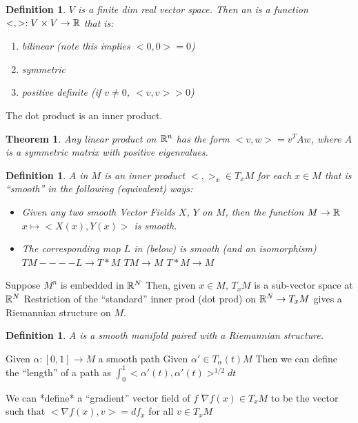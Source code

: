 \documentclass[11pt]{amsbook}
\theoremstyle{mystyle} \newtheorem{thrm}[thm]{Theorem}
\theoremstyle{mystyle} \newtheorem{defi}[thm]{Definition}
\theoremstyle{mystyle} \newtheorem{coro}[thm]{Corollary}
\theoremstyle{mystyle} \newtheorem{propo}[thm]{Proposition}
\theoremstyle{mystyle} \newtheorem{lemm}[thm]{Lemma}
\numberwithin{thm}{section}
\newcommand{\x}{\times}
\newcommand{\grad}{\nabla}
\begin{document}
\begin{defi}
	$V$ is a finite dim real vector space.  Then an  is a function $<,> : V \x V \to \R$ that is:
	\begin{enumerate}
		\item bilinear (note this implies $<0,0> = 0$)
		\item symmetric
		\item positive definite (if $v \neq 0$, $<v,v> > 0$)
	\end{enumerate}
\end{defi}
\begin{example}
	The dot product is an inner product.
\end{example}
\begin{thrm}
	Any linear product on ${\mathbb R}^n$ has the form $<v,w> = v^T A w$, where $A$ is a symmetric matrix with positive eigenvalues.
\end{thrm}
\begin{defi}
	A  in $M$ is an inner product $<,>_x \in T_xM$ for each $x \in M$ that is ``smooth'' in the following (equivalent) ways:
	\begin{itemize}
		\item
		Given any two smooth Vector Fields $X$, $Y$ on $M$, then
		the function $M \to {\mathbb R}$
		$x \mapsto <X(x), Y(x)>$
		is smooth.
		\item
		The corresponding map $L$ in (below) is smooth (and an isomorphism)
		$TM ----L\to T*M$
		$TM \to M$
		$T*M \to M$
	\end{itemize}
\end{defi}
\begin{example}
	Suppose $M^n$ is embedded in ${\mathbb R}^N$
	Then, given $x \in M$, $T_xM$ is a sub-vector space at ${\mathbb R}^N$
	Restriction of the ``standard'' inner prod (dot prod) on ${\mathbb R}^N \to T_xM$ gives a Riemannian structure on $M$.
\end{example}
\begin{defi}
	A  is a smooth manifold paired with a Riemannian structure.
\end{defi}
\begin{example}
	Given $\alpha : [0,1] \to M$ a smooth path
	Given $\alpha' \in T_\alpha(t)M$
	Then we can define the ``length'' of a path as $\int_0^1 <\alpha'(t), \alpha'(t)>^{1/2} dt$
\end{example}
\begin{example}
	We can *define* a ``gradient'' vector field of $f$
	$\grad f(x) \in T_xM$ to be the vector such that
	$< \grad f (x), v > = df_x$ for all $v \in T_xM$
\end{example}
\end{document}
